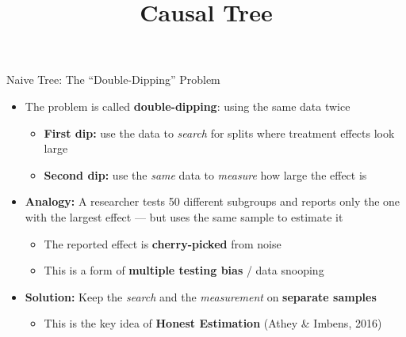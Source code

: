 \documentclass[hyperref={pdfpagelabels=false}]{beamer}
\begin{document}
\begin{frame}{Naive Tree: The ``Double-Dipping'' Problem}
	\begin{itemize}
		\item The problem is called \textbf{double-dipping}: using the same data twice
		\vspace{0.3cm}
		\begin{itemize}
			\item \textbf{First dip:} use the data to \textit{search} for splits where treatment effects look large
			\vspace{0.2cm}
			\item \textbf{Second dip:} use the \textit{same} data to \textit{measure} how large the effect is
		\end{itemize}
		\vspace{0.3cm}
		\item \textbf{Analogy:} A researcher tests 50 different subgroups and reports only the one with the largest effect --- but uses the same sample to estimate it
		\vspace{0.2cm}
		\begin{itemize}
			\item The reported effect is \textbf{cherry-picked} from noise
			\vspace{0.2cm}
			\item This is a form of \textbf{multiple testing bias} / data snooping
		\end{itemize}
		\vspace{0.3cm}
		\item \textbf{Solution:} Keep the \textit{search} and the \textit{measurement} on \textbf{separate samples}
		\vspace{0.2cm}
		\begin{itemize}
			\item This is the key idea of \textbf{Honest Estimation} (Athey \& Imbens, 2016)
		\end{itemize}
	\end{itemize}
\end{frame}




\title[]
{Causal Tree}

\author{}
\institute{}
\date{}

\begin{frame}{}
	\titlepage
\end{frame}
\end{document}
